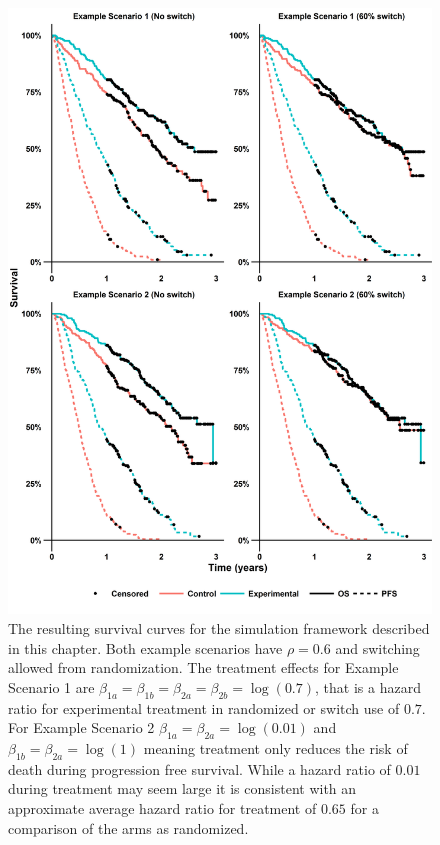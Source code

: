 \begin{figure}[h!]
\centering
\includegraphics[width=12cm]{images/chap_simdesign/examplekm.png}
\caption{\label{F:chap_sim_design:exampleKM} The resulting survival curves for the simulation framework described in this chapter. Both example scenarios have $\rho=0.6$ and switching allowed from randomization. The treatment effects for Example Scenario 1 are $\beta_{1a} = \beta_{1b} = \beta_{2a} = \beta_{2b} = \log(0.7)$, that is a hazard ratio for experimental treatment in randomized or switch use of $0.7$. For Example Scenario 2 $\beta_{1a} = \beta_{2a} = \log(0.01)$ and $\beta_{1b}=\beta_{2a}=\log(1)$ meaning treatment only reduces the risk of death during progression free survival. While a hazard ratio of $0.01$ during treatment may seem large it is consistent with an approximate average hazard ratio for treatment of $0.65$ for a comparison of the arms as randomized.
}
\end{figure}

\clearpage


